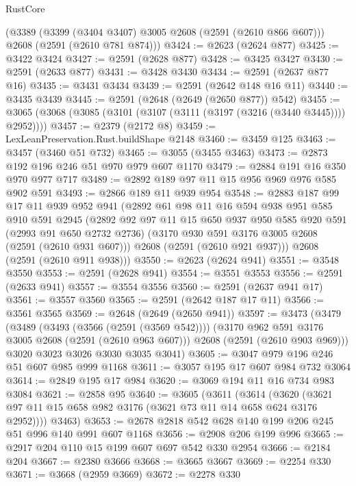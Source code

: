 \begin{lexlean}{RustCore}
\begin{coremodule}
    (@3389
      (@3399 (@3404 @3407) @3005 @2608 (@2591 (@2610 @866 @607)))
      @2608
      (@2591 (@2610 @781 @874)))
@3424 := @2623 (@2624 @877)
@3425 := @3422 @3424
@3427 := @2591 (@2628 @877)
@3428 := @3425 @3427
@3430 := @2591 (@2633 @877)
@3431 := @3428 @3430
@3434 := @2591 (@2637 @877 @16)
@3435 := @3431 @3434
@3439 := @2591 (@2642 @148 @16 @11)
@3440 := @3435 @3439
@3445 := @2591 (@2648 (@2649 (@2650 @877)) @542)
@3455 := @3065 (@3068 (@3085 (@3101 (@3107 (@3111 (@3197 (@3216 (@3440 @3445)))) @2952))))
@3457 := @2379 (@2172 @8)
@3459 := LexLeanPreservation.Rust.buildShape @2148
@3460 := @3459 @125
@3463 := @3457 (@3460 @51 @732)
@3465 := @3055 (@3455 @3463)
@3473 := @2873 @192 @196 @246 @51 @970 @979 @607 @1170
@3479 := @2884 @191 @16 @350 @970 @977 @717
@3489 := @2892 @189 @97 @11 @15 @956 @969 @976 @585 @902 @591
@3493 := @2866 @189 @11 @939 @954
@3548 := @2883
    @187
    @99
    @17
    @11
    @939
    @952
    @941
    (@2892
      @61
      @98
      @11
      @16
      @594
      @938
      @951
      @585
      @910
      @591
      @2945
      (@2892
        @92
        @97
        @11
        @15
        @650
        @937
        @950
        @585
        @920
        @591
        (@2993 @91 @650 @2732 @2736)
        (@3170 @930 @591 @3176 @3005 @2608 (@2591 (@2610 @931 @607)))
        @2608
        (@2591 (@2610 @921 @937)))
      @2608
      (@2591 (@2610 @911 @938)))
@3550 := @2623 (@2624 @941)
@3551 := @3548 @3550
@3553 := @2591 (@2628 @941)
@3554 := @3551 @3553
@3556 := @2591 (@2633 @941)
@3557 := @3554 @3556
@3560 := @2591 (@2637 @941 @17)
@3561 := @3557 @3560
@3565 := @2591 (@2642 @187 @17 @11)
@3566 := @3561 @3565
@3569 := @2648 (@2649 (@2650 @941))
@3597 := @3473
    (@3479
      (@3489
        (@3493 (@3566 (@2591 (@3569 @542))))
        (@3170 @962 @591 @3176 @3005 @2608 (@2591 (@2610 @963 @607)))
        @2608
        (@2591 (@2610 @903 @969)))
      @3020
      @3023
      @3026
      @3030
      @3035
      @3041)
@3605 := @3047 @979 @196 @246 @51 @607 @985 @999 @1168
@3611 := @3057 @195 @17 @607 @984 @732 @3064
@3614 := @2849 @195 @17 @984
@3620 := @3069 @194 @11 @16 @734 @983 @3084
@3621 := @2858 @95
@3640 := @3605
    (@3611
      (@3614 (@3620 (@3621 @97 @11 @15 @658 @982 @3176 (@3621 @73 @11 @14 @658 @624 @3176 @2952))))
      @3463)
@3653 := @2678 @2818 @542 @628 @140 @199 @206 @245 @51 @996 @140 @991 @607 @1168
@3656 := @2908 @206 @199 @996
@3665 := @2917 @204 @110 @15 @199 @607 @697 @542 @330 @2954
@3666 := @2184 @204
@3667 := @2380 @3666
@3668 := @3665 @3667
@3669 := @2254 @330
@3671 := @3668 (@2959 @3669)
@3672 := @2278 @330

\end{coremodule}
\end{lexlean}
